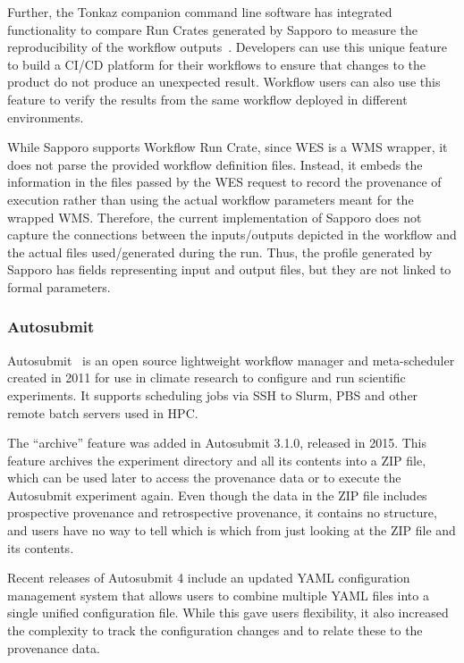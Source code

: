 Further, the Tonkaz companion command line software has integrated functionality to compare Run Crates generated by Sapporo to measure the reproducibility of the workflow outputs~\cite{Suetake 2023}.
Developers can use this unique feature to build a CI/CD platform for their workflows to ensure that changes to the product do not produce an unexpected result.
Workflow users can also use this feature to verify the results from the same workflow deployed in different environments.

While Sapporo supports Workflow Run Crate, since WES is a WMS wrapper, it does not parse the provided workflow definition files. 
Instead, it embeds the information in the files passed by the WES request to record the provenance of execution rather than using the actual workflow parameters meant for the wrapped WMS.
Therefore, the current implementation of Sapporo does not capture the connections between the inputs/outputs depicted in the workflow and the actual files used/generated during the run.
Thus, the profile generated by Sapporo has fields representing input and output files, but they are not linked to formal parameters.

\subsubsection{Autosubmit}\label{ch54:autosubmit}

Autosubmit~\cite{Manubens-Gil 2016} is an open source lightweight workflow manager and meta-scheduler created in 2011 for use in climate research to configure and run scientific experiments.
It supports scheduling jobs via SSH to Slurm, PBS and other remote batch servers used in HPC.

The ``archive'' feature was added in Autosubmit 3.1.0, released in 2015.
This feature archives the experiment directory and all its contents into a ZIP file, which can be used later to access the provenance data or to execute the Autosubmit experiment again.
Even though the data in the ZIP file includes prospective provenance and retrospective provenance, it contains no structure, and users have no way to tell which is which from just looking at the ZIP file and its contents.

Recent releases of Autosubmit 4 include an updated YAML configuration management system that allows users to combine multiple YAML files into a single unified configuration file.
While this gave users flexibility, it also increased the complexity to track the configuration changes and to relate these to the provenance data.

